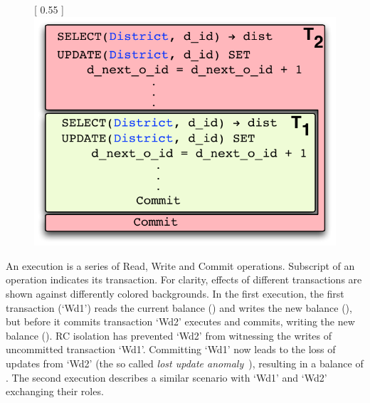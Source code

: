 \begin{figure}[!h]
\centering
{} [
  0.55\columnwidth
] {
  \includegraphics[scale=0.5]{Figures/motiv-eg-1-a}
}
\end{figure}

An execution is a series of Read, Write and Commit operations.
Subscript of an operation indicates its transaction. For clarity,
effects of different transactions are shown against differently
colored backgrounds. In the first execution, the first transaction
(`Wd1') reads the current balance () and writes the new balance
(), but before it commits transaction `Wd2' executes and
commits, writing the new balance (). RC isolation has
prevented `Wd2' from witnessing the writes of uncommitted transaction
`Wd1'. Committing `Wd1' now leads to the loss of updates from `Wd2'
(the so called \emph{lost update anomaly}~\cite{berenson}), resulting
in a balance of . The second execution describes a similar
scenario with `Wd1' and `Wd2' exchanging their roles. 

